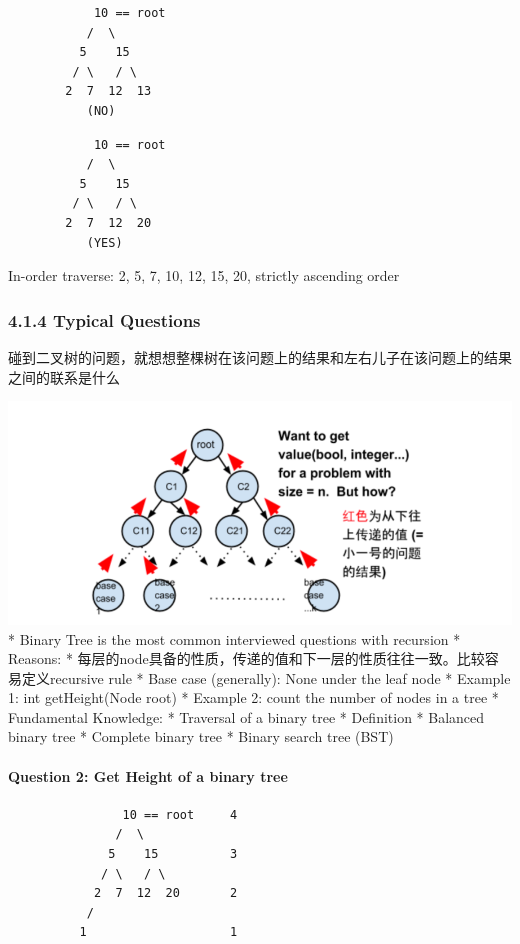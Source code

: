 \documentclass[11pt]{article}
\makeatletter
\def\maxwidth{\ifdim\Gin@nat@width>\linewidth\linewidth
    \else\Gin@nat@width\fi}
\let\Oldincludegraphics\includegraphics
\renewcommand{\includegraphics}[1]{\Oldincludegraphics[width=.8\maxwidth]{#1}}
\makeatother
\begin{document}
\begin{itemize}
\begin{verbatim}
            10 == root
           /  \
          5    15
         / \   / \ 
        2  7  12  13
           (NO)
\end{verbatim}

\begin{verbatim}
            10 == root
           /  \
          5    15
         / \   / \ 
        2  7  12  20
           (YES)
\end{verbatim}

  In-order traverse: 2, 5, 7, 10, 12, 15, 20, strictly ascending order
\end{itemize}

    \subsubsection{4.1.4 Typical Questions}\label{typical-questions}

碰到二叉树的问题，就想想整棵树在该问题上的结果和左右儿子在该问题上的结果之间的联系是什么

\includegraphics{source/lesson6_binarytree_recursion1.png} * Binary Tree
is the most common interviewed questions with recursion * Reasons: *
每层的node具备的性质，传递的值和下一层的性质往往一致。比较容易定义recursive
rule * Base case (generally): None under the leaf node * Example 1: int
getHeight(Node root) * Example 2: count the number of nodes in a tree *
Fundamental Knowledge: * Traversal of a binary tree * Definition *
Balanced binary tree * Complete binary tree * Binary search tree (BST)

    \paragraph{Question 2: Get Height of a binary
tree}\label{question-2-get-height-of-a-binary-tree}

\begin{verbatim}
                10 == root     4
               /  \
              5    15          3
             / \   / \ 
            2  7  12  20       2
           /
          1                    1
\end{verbatim}
\end{document}
